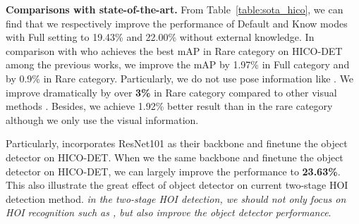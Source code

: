 \documentclass[runningheads]{llncs}
\begin{document}
{\bf Comparisons with state-of-the-art.} From Table~\ref{table:sota_hico}, we can find that we respectively improve the performance of Default and Know modes with Full setting to 19.43\% and 22.00\% without external knowledge.
In comparison with \cite{wan2019pose} who achieves the best mAP in Rare category on HICO-DET among the previous works,
we improve the mAP by 1.97\% in Full category and by 0.9\% in Rare category. Particularly, we do not use pose information like \cite{wan2019pose}. We improve dramatically by over {\bf 3\%} in Rare category compared to other visual methods \cite{qi2018learning, gao2018ican, li2018transferable, gupta2018no, Zhou_2019_ICCV}. Besides, we achieve 1.92\% better result than \cite{Peyre_2019_ICCV} in the rare category although we only use the visual information.

Particularly, \cite{bansal2019detecting} incorporates ResNet101 as their backbone and finetune the object detector on HICO-DET. When we the same backbone and finetune the object detector on HICO-DET, we can largely improve the performance to {\bf 23.63\%}. This also illustrate the great effect of object detector on current two-stage HOI detection method.
\textit{in the two-stage HOI detection, we should not only focus on HOI recognition such as \cite{gao2018ican, li2018transferable, Zhou_2019_ICCV}, but also improve the object detector performance}.
\end{document}
